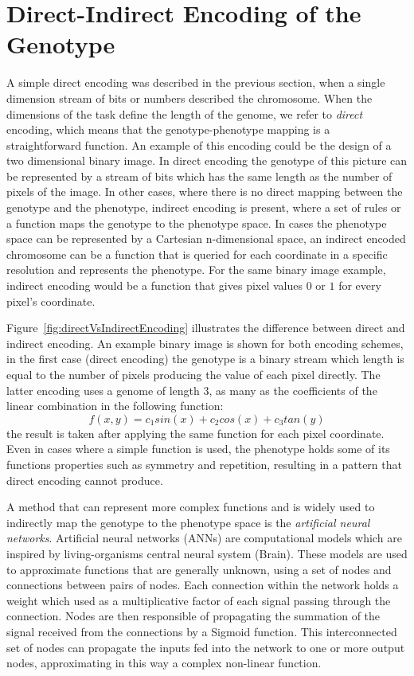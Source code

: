 \section{Direct-Indirect Encoding of the Genotype}
\label{DirectIndirect}

A simple direct encoding was described in the previous section, when a single dimension stream of bits or numbers described the chromosome. When the dimensions of the task define the length of the genome, we refer to \emph{direct} encoding, which means that the genotype-phenotype mapping is a straightforward function. An example of this encoding could be the design of a two dimensional binary image. In direct encoding the genotype of this picture can be represented by a stream of bits which has the same length as the number of pixels of the image. In other cases, where there is no direct mapping between the genotype and the phenotype, indirect encoding is present, where a set of rules or a function maps the genotype to the phenotype space. In cases the phenotype space can be represented by a Cartesian n-dimensional space, an indirect encoded chromosome can be a function that is queried for each coordinate in a specific resolution and represents the phenotype. For the same binary image example, indirect encoding would be a function that gives pixel values $0$ or $1$ for every pixel's coordinate. 



Figure~\ref{fig:directVsIndirectEncoding} illustrates the difference between direct and indirect encoding. An example binary image is shown for both encoding schemes, in the first case (direct encoding) the genotype is a binary stream which length is equal to the number of pixels producing the value of each pixel directly. The latter encoding uses a genome of length 3, as many as the coefficients of the linear combination in the following function: 
\[f(x,y) = c_1 sin(x) + c_2 cos(x) + c_3 tan(y)
\]
the result is taken after applying the same function for each pixel coordinate. Even in cases where a simple function is used, the  phenotype holds some of its functions properties such as symmetry and repetition, resulting in a pattern that direct encoding cannot produce.

A method that can represent more complex functions and is widely used to indirectly map the genotype to the phenotype space is the \emph{artificial neural networks}. Artificial neural networks (ANNs) are computational models which are inspired by living-organisms central neural system (Brain). These models are used to approximate functions that are generally unknown, using a set of nodes and connections between pairs of nodes. Each connection within the network holds a weight which used as a multiplicative factor of each signal passing through the connection. Nodes are then responsible of propagating the summation of the signal received from the connections by a Sigmoid function. This interconnected set of nodes can propagate the inputs fed into the network to one or more output nodes, approximating in this way a complex non-linear function.


